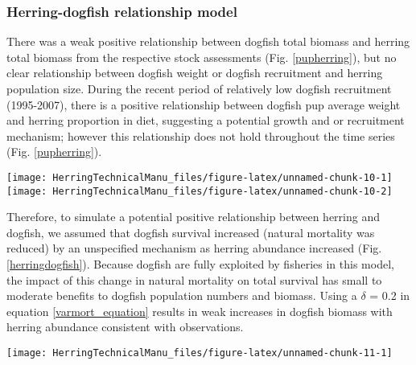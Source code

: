 \documentclass[]{article}
\let\origfigure\figure
\let\endorigfigure\endfigure
\renewenvironment{figure}[1][2] {
    \expandafter\origfigure\expandafter[H]
} {
    \endorigfigure
}
\begin{document}
\subsubsection{Herring-dogfish relationship
model}\label{herring-dogfish-relationship-model}

There was a weak positive relationship between dogfish total biomass and
herring total biomass from the respective stock assessments (Fig.
\ref{pupherring}), but no clear relationship between dogfish weight or
dogfish recruitment and herring population size. During the recent
period of relatively low dogfish recruitment (1995-2007), there is a
positive relationship between dogfish pup average weight and herring
proportion in diet, suggesting a potential growth and or recruitment
mechanism; however this relationship does not hold throughout the time
series (Fig. \ref{pupherring}).

\begin{figure}

{\centering \texttt{[image: HerringTechnicalManu\_files/figure-latex/unnamed-chunk-10-1]} \texttt{[image: HerringTechnicalManu\_files/figure-latex/unnamed-chunk-10-2]} 

}

\caption{Dogfish population relationships with herring total biomass (left) and herring proportion in diet (right) \label{pupherring}}\label{fig:unnamed-chunk-10}
\end{figure}

Therefore, to simulate a potential positive relationship between herring
and dogfish, we assumed that dogfish survival increased (natural
mortality was reduced) by an unspecified mechanism as herring abundance
increased (Fig. \ref{herringdogfish}). Because dogfish are fully
exploited by fisheries in this model, the impact of this change in
natural mortality on total survival has small to moderate benefits to
dogfish population numbers and biomass. Using a \(\delta\) = 0.2 in
equation \ref{varmort_equation} results in weak increases in dogfish
biomass with herring abundance consistent with observations.

\begin{figure}

{\centering \texttt{[image: HerringTechnicalManu\_files/figure-latex/unnamed-chunk-11-1]} 

}

\caption{Modeled herring relative population size-dogfish natural mortality relationship \label{herringdogfish}}\label{fig:unnamed-chunk-11}
\end{figure}
\end{document}
